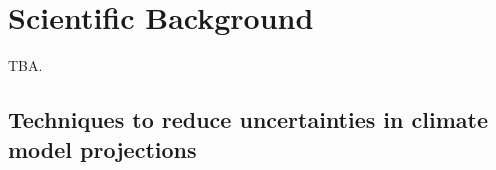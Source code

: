 


\chapter{Scientific Background}
\label{ch:scientific_background}

TBA.


\section{Techniques to reduce uncertainties in climate model projections}
\label{sec:scientific_background:techniques}